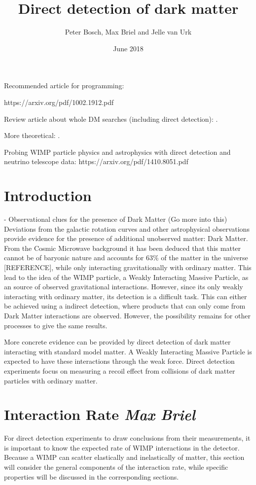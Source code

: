 \documentclass{article}
\title{Direct detection of dark matter}
\author{Peter Bosch, Max Briel and Jelle van Urk}
\date{June 2018}
\begin{document}
\maketitle
\newpage
\tableofcontents
\newpage
Recommended article for programming:

https://arxiv.org/pdf/1002.1912.pdf

Review article about whole DM searches (including direct detection): \cite{Roszkowski:2017nbc}.

More theoretical: \cite{Queiroz:2017kxt}.

Probing WIMP particle physics and astrophysics with direct detection and neutrino telescope data:
https://arxiv.org/pdf/1410.8051.pdf

\section{Introduction}


- Observational clues for the presence of Dark Matter (Go more into this) 
Deviations from the galactic rotation curves and other astrophysical observations provide evidence for the presence of additional unobserved matter: Dark Matter. From the Cosmic Microwave background it has been deduced that this matter cannot be of baryonic nature and accounts for 63\% of the matter in the universe [REFERENCE], while only interacting gravitationally with ordinary matter. 
This lead to the idea of the WIMP particle, a Weakly Interacting Massive Particle, as an source of observed gravitational interactions. 
However, since its only weakly interacting with ordinary matter, its detection is a difficult task. This can either be achieved using a indirect detection, where products that can only come from Dark Matter interactions are observed. However, the possibility remains for other processes to give the same results. 

More concrete evidence can be provided by direct detection of dark matter interacting with standard model matter. A Weakly Interacting Massive Particle is expected to have these interactions through the weak force. Direct detection experiments focus on measuring a recoil effect from collisions of dark matter particles with ordinary matter.

\FloatBarrier
\section{Interaction Rate \small{\textit{Max Briel}}}

For direct detection experiments to draw conclusions from their measurements, it is important to know the expected rate of WIMP interactions in the detector. Because a WIMP can scatter elastically and inelastically of matter, this section will consider the general components of the interaction rate, while specific properties will be discussed in the corresponding sections. 
\end{document}
